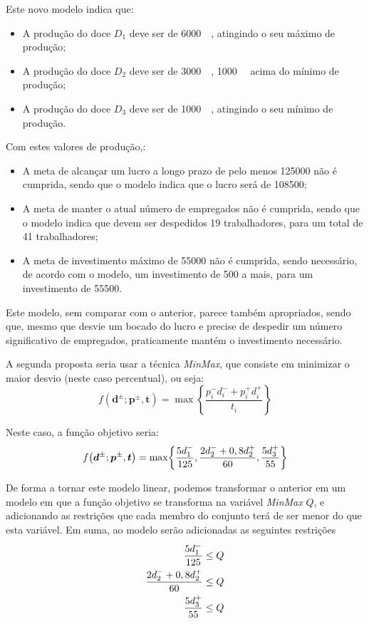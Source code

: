 Este novo modelo indica que:
\begin{itemize}
  \item A produção do doce $D_1$ deve ser de \qty{6000}{\kilo\grams}, atingindo o seu máximo de produção;
  \item A produção do doce $D_2$ deve ser de \qty{3000}{\kilo\grams}, \qty{1000}{\kilo\grams} acima do mínimo de produção;
  \item A produção do doce $D_3$ deve ser de \qty{1000}{\kilo\grams}, atingindo o seu mínimo de produção.
\end{itemize}

Com estes valores de produção,:

\begin{itemize}
  \item A meta de alcançar um lucro a longo prazo de pelo menos \qty{125000}{\geneuro} não é cumprida, sendo que o modelo indica que o lucro será de \qty{108500}{\geneuro};
  \item A meta de manter o atual número de empregados não é cumprida, sendo que o modelo indica que devem ser despedidos 19 trabalhadores, para um total de 41 trabalhadores;
  \item A meta de investimento máximo de \qty{55000}{\geneuro} não é cumprida, sendo necessário, de acordo com o modelo, um investimento de \qty{500}{\geneuro} a mais, para um investimento de \qty{55500}{\geneuro}.
\end{itemize}

Este modelo, sem comparar com o anterior, parece também apropriados, sendo que, mesmo que desvie um bocado do lucro e precise de despedir um número significativo de empregados, praticamente mantém o investimento necessário.

A segunda proposta seria usar a técnica \textit{MinMax}, que consiste em minimizar o maior desvio (neste caso percentual), ou seja:
$$
f\left(\mathbold{d^\pm}; \mathbold{p^\pm}, \mathbold{t}\right) = \max\left\{\frac{p_i^-d_i^- + p_i^+d_i^+}{t_i}\right\}
$$

Neste caso, a função objetivo seria:
$$
f\left(\mathbold{d^\pm}; \mathbold{p^\pm}, \mathbold{t}\right) = \max\left\{\frac{5\d1-}{125}, \frac{2\d2- + 0,8\d2+}{60}, \frac{5\d3+}{55}\right\}
$$

De forma a tornar este modelo linear, podemos transformar o anterior em um modelo em que a função objetivo se transforma na variável \textit{MinMax} $Q$, e adicionando as restrições que cada membro do conjunto terá de ser menor do que esta variável. Em suma, ao modelo serão adicionadas as seguintes restrições
\begin{align*}
  \frac{5d_{1}^{-}}{125} &\leq Q \\
  \frac{2d_{2}^{-} + 0,8d_{2}^{+}}{60} &\leq Q \\
  \frac{5d_{3}^{+}}{55} &\leq Q \\
\end{align*}

